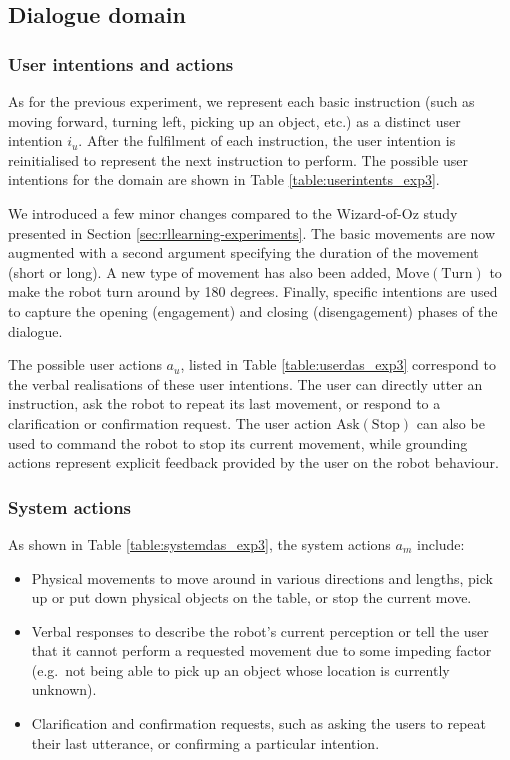 \subsection{Dialogue domain}
\subsubsection*{User intentions and actions}
As for the previous experiment, we represent each basic instruction (such as moving forward, turning left, picking up an object, etc.) as a distinct user intention $i_u$. After the fulfilment of each instruction, the user intention is reinitialised to represent the next instruction to perform.  The possible user intentions for the domain are shown in Table \ref{table:userintents_exp3}.  


We introduced a few minor changes compared to the Wizard-of-Oz study presented in Section \ref{sec:rllearning-experiments}. The basic movements are now augmented with a second argument specifying the duration of the movement (short or long). A new type of movement has also been added, $\mathrm{Move(Turn)}$ to make the robot turn around by 180 degrees.  Finally, specific intentions are used to capture the opening (engagement) and closing (disengagement) phases of the dialogue. 

The possible user actions $a_u$, listed in Table \ref{table:userdas_exp3} correspond to the verbal realisations of these user intentions. The user can directly utter an instruction, ask the robot to repeat its last movement, or respond to a clarification or confirmation request.   The user action $\mathrm{Ask(Stop)}$ can also be used to command the robot to stop its current movement, while grounding actions represent explicit feedback provided by the user on the robot behaviour.

\subsubsection*{System actions}
As shown in Table \ref{table:systemdas_exp3}, the system actions $a_m$ include: \begin{itemize}
\item Physical movements to move around in various directions and lengths, pick up or put down physical objects on the table, or stop the current move.
\item Verbal responses to describe the robot's current perception or tell the user that it cannot perform a requested movement due to some impeding factor (e.g.\ not being able to pick up an object whose location is currently unknown). 
\item Clarification and confirmation requests, such as asking the users to repeat their last utterance, or confirming a particular intention.
\end{itemize}

